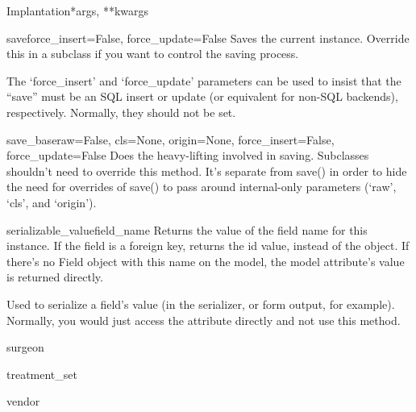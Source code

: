 \documentclass[letterpaper,10pt,english]{sphinxmanual}
\begin{document}
\begin{classdesc}{Implantation}{*args, **kwargs}
\hypertarget{data.models.Implantation.save}{}\begin{methoddesc}[Implantation]{save}{force\_insert=False, force\_update=False}
Saves the current instance. Override this in a subclass if you want to
control the saving process.

The `force\_insert' and `force\_update' parameters can be used to insist
that the ``save'' must be an SQL insert or update (or equivalent for
non-SQL backends), respectively. Normally, they should not be set.
\end{methoddesc}

\hypertarget{data.models.Implantation.save_base}{}\begin{methoddesc}[Implantation]{save\_base}{raw=False, cls=None, origin=None, force\_insert=False, force\_update=False}
Does the heavy-lifting involved in saving. Subclasses shouldn't need to
override this method. It's separate from save() in order to hide the
need for overrides of save() to pass around internal-only parameters
(`raw', `cls', and `origin').
\end{methoddesc}

\hypertarget{data.models.Implantation.serializable_value}{}\begin{methoddesc}[Implantation]{serializable\_value}{field\_name}
Returns the value of the field name for this instance. If the field is
a foreign key, returns the id value, instead of the object. If there's
no Field object with this name on the model, the model attribute's
value is returned directly.

Used to serialize a field's value (in the serializer, or form output,
for example). Normally, you would just access the attribute directly
and not use this method.
\end{methoddesc}

\hypertarget{data.models.Implantation.surgeon}{}\begin{memberdesc}[Implantation]{surgeon}\end{memberdesc}

\hypertarget{data.models.Implantation.treatment_set}{}\begin{memberdesc}[Implantation]{treatment\_set}\end{memberdesc}

\hypertarget{data.models.Implantation.vendor}{}\begin{memberdesc}[Implantation]{vendor}\end{memberdesc}
\end{classdesc}
\end{document}
